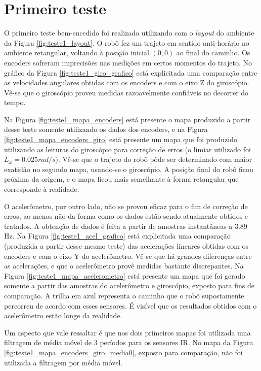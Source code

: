 

\section{Primeiro teste}


O primeiro teste bem-sucedido foi realizado utilizando com o \textit{layout} do ambiente da Figura \ref{fig:teste1_layout}. O robô fez um trajeto em sentido anti-horário no ambiente retangular, voltando à posição inicial $(0,0)$ ao final do caminho. Os encoders sofreram imprecisões nas medições em certos momentos do trajeto. No gráfico da Figura \ref{fig:teste1_giro_grafico} está explicitada uma comparação entre as velocidades angulares obtidas com os encoders e com o eixo Z do giroscópio. Vê-se que o giroscópio proveu medidas razoavelmente confiáveis no decorrer do tempo. 

Na Figura \ref{fig:teste1_mapa_encoders} está presente o mapa produzido a partir desse teste somente utilizando os dados dos encoders, e na Figura \ref{fig:teste1_mapa_encoders_giro} está presente um mapa que foi produzido utilizando as leituras do giroscópio para correção de erros (o limiar utilizado foi $L_\omega = 0.025 \unit{rad/s}$). Vê-se que o trajeto do robô pôde ser determinado com maior exatidão no segundo mapa, usando-se o giroscópio. A posição final do robô ficou próxima da origem, e o mapa ficou mais semelhante à forma retangular que corresponde à realidade. 

O acelerômetro, por outro lado, não se provou eficaz para o fim de correção de erros, ao menos não da forma como os dados estão sendo atualmente obtidos e tratados. A obtenção de dados é feita a partir de amostras instantâneas a 3.89 Hz. Na Figura \ref{fig:teste1_acel_grafico} está explicitada uma comparação (produzida a partir desse mesmo teste) das acelerações lineares obtidas com os encoders e com o eixo Y do acelerômetro. Vê-se que há grandes diferenças entre as acelerações, e que o acelerômetro provê medidas bastante discrepantes. Na Figura \ref{fig:teste1_mapa_acelerometro} está presente um mapa que foi gerado somente a partir das amostras do acelerômetro e giroscópio, exposto para fins de comparação. A trilha em azul representa o caminho que o robô supostamente percorreu de acordo com esses sensores. É visível que os resultados obtidos com o acelerômetro estão longe da realidade.

Um aspecto que vale ressaltar é que nos dois primeiros mapas foi utilizada uma filtragem de média móvel de 3 períodos para os sensores IR. No mapa da Figura \ref{fig:teste1_mapa_encoders_giro_media0}, exposto para comparação, não foi utilizada a filtragem por média móvel.


